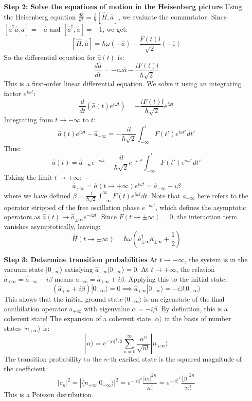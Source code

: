 \begin{solution}
\textbf{Step 2: Solve the equations of motion in the Heisenberg picture}
Using the Heisenberg equation $\frac{d\hat{a}}{dt} = \frac{i}{\hbar}[\hat{H}, \hat{a}]$, we evaluate the commutator.
Since $[\hat{a}^\dagger \hat{a}, \hat{a}] = -\hat{a}$ and $[\hat{a}^\dagger, \hat{a}] = -1$, we get:
\[ [\hat{H}, \hat{a}] = \hbar\omega(-\hat{a}) + \frac{F(t)l}{\sqrt{2}}(-1) \]
So the differential equation for $\hat{a}(t)$ is:
\[ \frac{d\hat{a}}{dt} = -i\omega\hat{a} - \frac{i F(t) l}{\hbar\sqrt{2}} \]
This is a first-order linear differential equation. We solve it using an integrating factor $e^{i\omega t}$:
\[ \frac{d}{dt}\left( \hat{a}(t) e^{i\omega t} \right) = - \frac{i F(t) l}{\hbar\sqrt{2}} e^{i\omega t} \]
Integrating from $t \to -\infty$ to $t$:
\[ \hat{a}(t) e^{i\omega t} - \hat{a}_{-\infty} = -\frac{i l}{\hbar\sqrt{2}} \int_{-\infty}^{t} F(t') e^{i\omega t'} dt' \]
Thus:
\[ \hat{a}(t) = \hat{a}_{-\infty} e^{-i\omega t} - \frac{i l}{\hbar\sqrt{2}} e^{-i\omega t} \int_{-\infty}^{t} F(t') e^{i\omega t'} dt' \]
Taking the limit $t \to +\infty$:
\[ \hat{a}_{+\infty} = \hat{a}(t \to +\infty) e^{i\omega t} = \hat{a}_{-\infty} - i\beta \]
where we have defined $\beta = \frac{l}{\hbar\sqrt{2}} \int_{-\infty}^{\infty} F(t) e^{i\omega t} dt$. Note that $a_{+\infty}$ here refers to the operator stripped of the free oscillation phase $e^{-i\omega t}$, which defines the asymptotic operators as $\hat{a}(t) \to \hat{a}_{\pm\infty}e^{-i\omega t}$.
Since $F(t \to \pm\infty) = 0$, the interaction term vanishes asymptotically, leaving:
\[ \hat{H}(t \to \pm\infty) = \hbar\omega\left(\hat{a}_{\pm\infty}^\dagger \hat{a}_{\pm\infty} + \frac{1}{2}\right) \]

\textbf{Step 3: Determine transition probabilities}
At $t \to -\infty$, the system is in the vacuum state $|0_{-\infty}\rangle$ satisfying $\hat{a}_{-\infty}|0_{-\infty}\rangle = 0$.
At $t \to +\infty$, the relation $\hat{a}_{+\infty} = \hat{a}_{-\infty} - i\beta$ means $\hat{a}_{-\infty} = \hat{a}_{+\infty} + i\beta$.
Applying this to the initial state:
\[ (\hat{a}_{+\infty} + i\beta)|0_{-\infty}\rangle = 0 \implies \hat{a}_{+\infty}|0_{-\infty}\rangle = -i\beta|0_{-\infty}\rangle \]
This shows that the initial ground state $|0_{-\infty}\rangle$ is an eigenstate of the final annihilation operator $\hat{a}_{+\infty}$ with eigenvalue $\alpha = -i\beta$. By definition, this is a coherent state!
The expansion of a coherent state $|\alpha\rangle$ in the basis of number states $|n_{+\infty}\rangle$ is:
\[ |\alpha\rangle = e^{-|\alpha|^2/2} \sum_{n=0}^{\infty} \frac{\alpha^n}{\sqrt{n!}} |n_{+\infty}\rangle \]
The transition probability to the $n$-th excited state is the squared magnitude of the coefficient:
\[ |c_n|^2 = |\langle n_{+\infty} | 0_{-\infty} \rangle|^2 = e^{-|\alpha|^2} \frac{|\alpha|^{2n}}{n!} = e^{-|\beta|^2} \frac{|\beta|^{2n}}{n!} \]
This is a Poisson distribution.


\end{solution}
